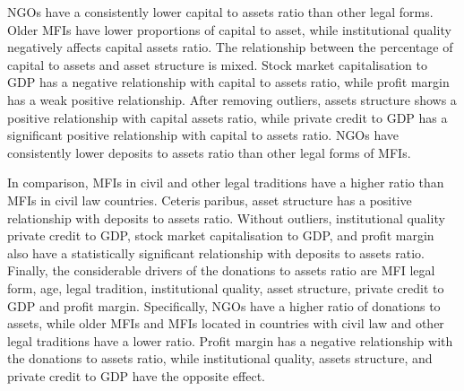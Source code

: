 \documentclass[a4paper,nobind]{templates/ociamthesis}
\begin{document}
NGOs have a consistently lower capital to assets ratio than other legal forms. Older MFIs have lower proportions of capital to asset, while institutional quality negatively affects capital assets ratio. The relationship between the percentage of capital to assets and asset structure is mixed. Stock market capitalisation to GDP has a negative relationship with capital to assets ratio, while profit margin has a weak positive relationship. After removing outliers, assets structure shows a positive relationship with capital assets ratio, while private credit to GDP has a significant positive relationship with capital to assets ratio. NGOs have consistently lower deposits to assets ratio than other legal forms of MFIs.

In comparison, MFIs in civil and other legal traditions have a higher ratio than MFIs in civil law countries. Ceteris paribus, asset structure has a positive relationship with deposits to assets ratio. Without outliers, institutional quality private credit to GDP, stock market capitalisation to GDP, and profit margin also have a statistically significant relationship with deposits to assets ratio. Finally, the considerable drivers of the donations to assets ratio are MFI legal form, age, legal tradition, institutional quality, asset structure, private credit to GDP and profit margin. Specifically, NGOs have a higher ratio of donations to assets, while older MFIs and MFIs located in countries with civil law and other legal traditions have a lower ratio. Profit margin has a negative relationship with the donations to assets ratio, while institutional quality, assets structure, and private credit to GDP have the opposite effect.
\end{document}
